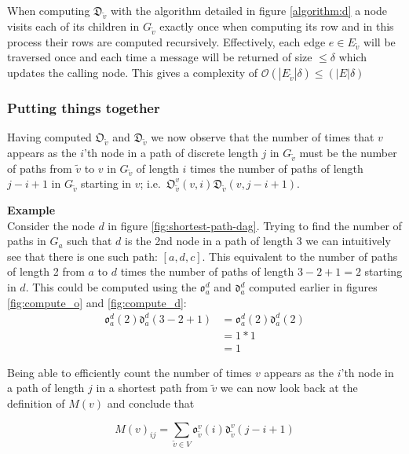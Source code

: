 \documentclass{article}
\begin{document}
When computing $\mathfrak{D}_{\tilde{v}}$ with the algorithm detailed in figure \ref{algorithm:d} a node visits each of its children in $G_{\tilde{v}}$ exactly once when computing its row and in this process their rows are computed recursively. Effectively, each edge $e\in E_{\tilde{v}}$ will be traversed once and each time a message will be returned of size $\leq \delta$ which updates the calling node. This gives a complexity of $\mathcal{O}(|E_{\tilde{v}}|\delta)\leq(|E|\delta)$


\subsubsection{Putting things together}
Having computed $\mathfrak{O}_{\tilde{v}}$ and $\mathfrak{D}_{\tilde{v}}$ we now observe that the number of times that $v$ appears as the $i$'th node in a path of discrete length $j$ in $G_{\tilde{v}}$ must be the number of paths from $\tilde{v}$ to $v$ in $G_{\tilde{v}}$ of length $i$ times the number of paths of length $j-i+1$ in $G_{\tilde{v}}$ starting in $v$; i.e.\ $\mathfrak{O}_{\tilde{v}}^v(v,i)\mathfrak{D}_{\tilde{v}}(v,j - i + 1)$.

\textbf{Example}\\
Consider the node $d$ in figure \ref{fig:shortest-path-dag}. Trying to find the number of paths in $G_{a}$ such that $d$ is the 2nd node in a path of length 3 we can intuitively see that there is one such path: $[a,d,c]$. This equivalent to the number of paths of length 2 from $a$ to $d$ times the number of paths of length $3-2+1=2$ starting in $d$.
This could be computed using the $\mathfrak{o}_a^d$ and $\mathfrak{d}_a^d$ computed earlier in figures \ref{fig:compute_o} and \ref{fig:compute_d}:
\begin{align}
\mathfrak{o}_a^d(2)\mathfrak{d}_a^d(3-2+1)&=\mathfrak{o}_a^d(2)\mathfrak{d}_a^d(2)\\
&=1 * 1\\
&=1
\end{align}

Being able to efficiently count the number of times $v$ appears as the $i$'th node in a path of length $j$ in a shortest path from $\tilde{v}$ we can now look back at the definition of $M(v)$ and conclude that

\begin{equation}
M(v)_{ij} = \sum_{\tilde{v}\in V}\mathfrak{o}_{\tilde{v}}^v(i)\mathfrak{d}_{\tilde{v}}^v(j-i+1)
\label{eq:runtime_comp_m}
\end{equation}
\end{document}
